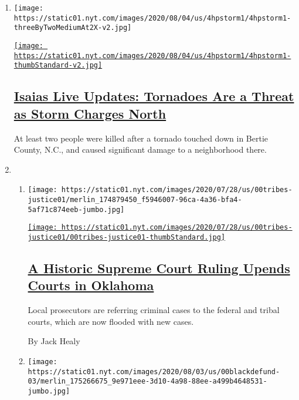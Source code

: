\begin{enumerate}
\def\labelenumi{\arabic{enumi}.}
\item
  \texttt{[image: https://static01.nyt.com/images/2020/08/04/us/4hpstorm1/4hpstorm1-threeByTwoMediumAt2X-v2.jpg]}

  \href{/2020/08/04/us/isaias-storm-updates.html}{\texttt{[image: https://static01.nyt.com/images/2020/08/04/us/4hpstorm1/4hpstorm1-thumbStandard-v2.jpg]}}

  \hypertarget{isaias-live-updates-tornadoes-are-a-threat-as-storm-charges-north}{%
  \subsection{\texorpdfstring{\href{/2020/08/04/us/isaias-storm-updates.html}{Isaias
  Live Updates: Tornadoes Are a Threat as Storm Charges
  North}}{Isaias Live Updates: Tornadoes Are a Threat as Storm Charges North}}\label{isaias-live-updates-tornadoes-are-a-threat-as-storm-charges-north}}

  At least two people were killed after a tornado touched down in Bertie
  County, N.C., and caused significant damage to a neighborhood there.
\item
  \begin{enumerate}
  \def\labelenumii{\arabic{enumii}.}
  \item
    \texttt{[image: https://static01.nyt.com/images/2020/07/28/us/00tribes-justice01/merlin\_174879450\_f5946007-96ca-4a36-bfa4-5af71c874eeb-jumbo.jpg]}

    \href{/2020/08/03/us/Supreme-court-Oklahoma-tribal-land-ruling.html}{\texttt{[image: https://static01.nyt.com/images/2020/07/28/us/00tribes-justice01/00tribes-justice01-thumbStandard.jpg]}}

    \hypertarget{a-historic-supreme-court-ruling-upends-courts-in-oklahoma}{%
    \subsection{\texorpdfstring{\href{/2020/08/03/us/Supreme-court-Oklahoma-tribal-land-ruling.html}{A
    Historic Supreme Court Ruling Upends Courts in
    Oklahoma}}{A Historic Supreme Court Ruling Upends Courts in Oklahoma}}\label{a-historic-supreme-court-ruling-upends-courts-in-oklahoma}}

    Local prosecutors are referring criminal cases to the federal and
    tribal courts, which are now flooded with new cases.

    By Jack Healy
  \item
    \texttt{[image: https://static01.nyt.com/images/2020/08/03/us/00blackdefund-03/merlin\_175266675\_9e971eee-3d10-4a98-88ee-a499b4648531-jumbo.jpg]}


\end{enumerate}
\end{enumerate}

